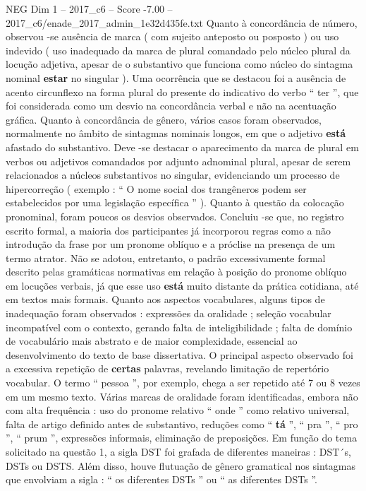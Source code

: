 \begin{textsample}{NEG Dim 1 – 2017\_c6 – Score -7.00 – 2017\_c6/enade\_2017\_admin\_1e32d435fe.txt}
Quanto à concordância de número, observou -se ausência de marca ( com sujeito anteposto ou posposto ) ou uso indevido ( uso inadequado da marca de plural comandado pelo núcleo plural da locução adjetiva, apesar de o substantivo que funciona como núcleo do sintagma nominal \textbf{estar} no singular ).
Uma ocorrência que se destacou foi a ausência de acento circunflexo na forma plural do presente do indicativo do verbo “ ter ”, que foi considerada como um desvio na concordância verbal e não na acentuação gráfica.
Quanto à concordância de gênero, vários casos foram observados, normalmente no âmbito de sintagmas nominais longos, em que o adjetivo \textbf{está} afastado do substantivo.
Deve -se destacar o aparecimento da marca de plural em verbos ou adjetivos comandados por adjunto adnominal plural, apesar de serem relacionados a núcleos substantivos no singular, evidenciando um processo de hipercorreção ( exemplo : “ O nome social dos trangêneros podem ser estabelecidos por uma legislação específica ” ).
Quanto à questão da colocação pronominal, foram poucos os desvios observados.
Concluiu -se que, no registro escrito formal, a maioria dos participantes já incorporou regras como a não introdução da frase por um pronome oblíquo e a próclise na presença de um termo atrator.
Não se adotou, entretanto, o padrão excessivamente formal descrito pelas gramáticas normativas em relação à posição do pronome oblíquo em locuções verbais, já que esse uso \textbf{está} muito distante da prática cotidiana, até em textos mais formais.
Quanto aos aspectos vocabulares, alguns tipos de inadequação foram observados : expressões da oralidade ; seleção vocabular incompatível com o contexto, gerando falta de inteligibilidade ; falta de domínio de vocabulário mais abstrato e de maior complexidade, essencial ao desenvolvimento do texto de base dissertativa.
O principal aspecto observado foi a excessiva repetição de \textbf{certas} palavras, revelando limitação de repertório vocabular.
O termo “ pessoa ”, por exemplo, chega a ser repetido até 7 ou 8 vezes em um mesmo texto.
Várias marcas de oralidade foram identificadas, embora não com alta frequência : uso do pronome relativo “ onde ” como relativo universal, falta de artigo definido antes de substantivo, reduções como “ \textbf{tá} ”, “ pra ”, “ pro ”, “ prum ”, expressões informais, eliminação de preposições.
Em função do tema solicitado na questão 1, a sigla DST foi grafada de diferentes maneiras : DST´s, DSTs ou DSTS.
Além disso, houve flutuação de gênero gramatical nos sintagmas que envolviam a sigla : “ os diferentes DSTs ” ou “ as diferentes DSTs ”.

\end{textsample}
